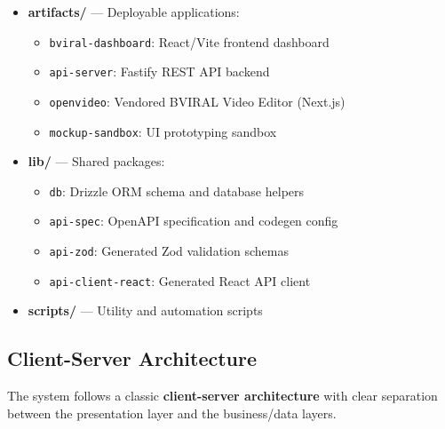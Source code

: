 \begin{itemize}
    \item \textbf{artifacts/} --- Deployable applications:
    \begin{itemize}
        \item \texttt{bviral-dashboard}: React/Vite frontend dashboard
        \item \texttt{api-server}: Fastify REST API backend
        \item \texttt{openvideo}: Vendored BVIRAL Video Editor (Next.js)
        \item \texttt{mockup-sandbox}: UI prototyping sandbox
    \end{itemize}
    \item \textbf{lib/} --- Shared packages:
    \begin{itemize}
        \item \texttt{db}: Drizzle ORM schema and database helpers
        \item \texttt{api-spec}: OpenAPI specification and codegen config
        \item \texttt{api-zod}: Generated Zod validation schemas
        \item \texttt{api-client-react}: Generated React API client
    \end{itemize}
    \item \textbf{scripts/} --- Utility and automation scripts
\end{itemize}

\subsection{Client-Server Architecture}

The system follows a classic \textbf{client-server architecture} with clear separation between the presentation layer and the business/data layers.



